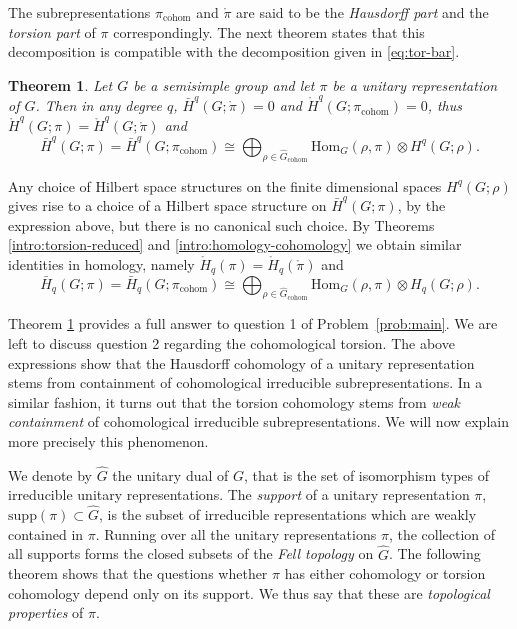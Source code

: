 \documentclass[12pt,reqno]{amsart}
\newtheorem{mainthm}{Theorem}
\theoremstyle{definition}
\newcommand{\torH}{\mathring{H}}
\newcommand{\barH}{\bar{H}}
\begin{document}
The subrepresentations $\pi_{\mathrm{cohom}}$ and $\mathring{\pi}$ are said to be the \emph{Hausdorff part} and the \emph{torsion part} of $\pi$ correspondingly.
The next theorem states that this decomposition is compatible with the decomposition given in \eqref{eq:tor-bar}.

\begin{mainthm} \label{intro-Hausdorff}
Let $G$ be a semisimple group and let $\pi$ be a unitary representation of $G$. Then in any degree $q$, $\barH^q(G;\mathring{\pi})=0$ and $\torH^q(G;\pi_{\mathrm{cohom}})=0$, thus $\torH^q(G;\pi)=\torH^q(G;\mathring{\pi})$ and 
\[ \bar{H}^q(G;\pi)= \bar{H}^q(G;\pi_{\mathrm{cohom}}) \cong \bigoplus_{\rho \in \widehat{G}_{\mathrm{cohom}}} \mathrm{Hom}_G(\rho,\pi) \otimes H^q(G;\rho). \]
\end{mainthm}

Any choice of Hilbert space structures on the finite dimensional spaces $H^q(G;\rho)$ gives rise to a choice of a Hilbert space structure on $\barH^q(G;\pi)$, by the expression above, but there is no canonical such choice.
By Theorems \ref{intro:torsion-reduced} and \ref{intro:homology-cohomology} we obtain similar identities in homology, namely 
$\torH_q(\pi)=\torH_q(\mathring{\pi})$ and 
\[ \bar{H}_q(G;\pi)= \bar{H}_q(G;\pi_{\mathrm{cohom}}) \cong \bigoplus_{\rho \in \widehat{G}_{\mathrm{cohom}}} \mathrm{Hom}_G(\rho,\pi) \otimes H_q(G;\rho). \]

Theorem \ref{intro-Hausdorff} provides a full answer to question 1 of Problem~\ref{prob:main}.
We are left to discuss question 2 regarding the cohomological torsion.
The above expressions show that the Hausdorff cohomology of a unitary representation stems from containment of cohomological irreducible subrepresentations.
In a similar fashion, it turns out that the torsion cohomology stems from \emph{weak containment} of cohomological irreducible subrepresentations.
We will now explain more precisely this phenomenon.

We denote by $\widehat{G}$ the unitary dual of $G$, that is the set of isomorphism types of irreducible unitary representations.
The \emph{support} of a unitary representation $\pi$, $\mathrm{supp}(\pi)\subset \widehat{G}$, is the subset of irreducible representations which are weakly contained in $\pi$.
Running over all the unitary representations $\pi$, the collection of all supports forms the closed subsets of the \emph{Fell topology} on $\widehat{G}$.
The following theorem shows that the questions whether $\pi$ has either cohomology or torsion cohomology depend only on its support.
We thus say that these are \emph{topological properties} of $\pi$.
\end{document}
